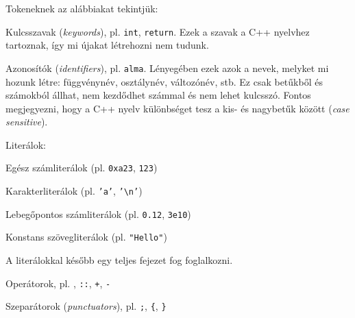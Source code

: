 \documentclass[a4paper,11.5pt,table]{article}
\begin{document}
	Tokeneknek az alábbiakat tekintjük:
	\begin{compactitem}
		\item Kulcsszavak (\textit{keywords}), pl. \texttt{int}, \texttt{return}. Ezek a szavak a C++ nyelvhez tartoznak, így mi újakat létrehozni nem tudunk.
		\item Azonosítók (\textit{identifiers}), pl. \texttt{alma}. Lényegében ezek azok a nevek, melyket mi hozunk létre: függvénynév, osztálynév, változónév, stb. Ez csak betűkből és számokból állhat, nem kezdődhet számmal és nem lehet kulcsszó. Fontos megjegyezni, hogy a C++ nyelv különbséget tesz a kis- és nagybetűk között (\textit{case sensitive}).
 		\item Literálok:
		\begin{compactitem}
			\item Egész számliterálok (pl. \texttt{0xa23}, \texttt{123})
			\item Karakterliterálok (pl. \texttt{'a'}, \texttt{'\textbackslash n'})
			\item Lebegőpontos számliterálok (pl. \texttt{0.12}, \texttt{3e10})
			\item Konstans szövegliterálok (pl. \texttt{"Hello"})
		\end{compactitem}
		A literálokkal később egy teljes fejezet fog foglalkozni.
		\item Operátorok, pl. \texttt{\<}, \texttt{::}, \texttt{+}, \texttt{-}
		\item Szeparátorok (\textit{punctuators}), pl. \texttt{;}, \texttt{\{}, \texttt{\}}
	\end{compactitem}
\end{document}
